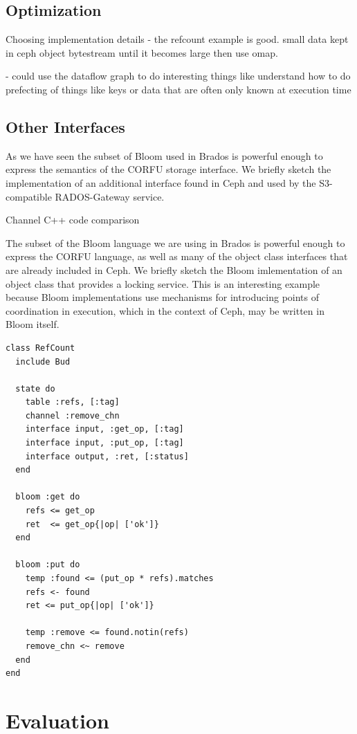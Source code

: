 \documentclass[10pt,twocolumn]{article}
\begin{document}
\subsection{Optimization}

Choosing implementation details
  - the refcount example is good. small data kept in ceph object bytestream
until it becomes large then use omap.

  - could use the dataflow graph to do interesting things like understand how
  to do prefecting of things like keys or data that are often only known at
  execution time

\subsection{Other Interfaces}

As we have seen the subset of Bloom used in Brados is powerful enough to
express the semantics of the CORFU storage interface. We briefly sketch the
implementation of an additional interface found in Ceph and used by the
S3-compatible RADOS-Gateway service.

Channel
C++ code comparison

The subset of the Bloom language we are using in Brados is powerful enough to
express the CORFU language, as well as many of the object class interfaces that
are already included in Ceph. We briefly sketch the Bloom imlementation of an
object class that provides a locking service. This is an interesting example
because Bloom implementations use mechanisms for introducing points of
coordination in execution, which in the context of Ceph, may be written in
Bloom itself. 

\begin{lstlisting}[caption={Hello}, label=lab]
class RefCount
  include Bud

  state do
    table :refs, [:tag]
    channel :remove_chn
    interface input, :get_op, [:tag]
    interface input, :put_op, [:tag]
    interface output, :ret, [:status]
  end

  bloom :get do
    refs <= get_op
    ret  <= get_op{|op| ['ok']}
  end

  bloom :put do
    temp :found <= (put_op * refs).matches
    refs <- found
    ret <= put_op{|op| ['ok']}

    temp :remove <= found.notin(refs)	
    remove_chn <~ remove
  end
end
\end{lstlisting}

\section{Evaluation}
\end{document}
